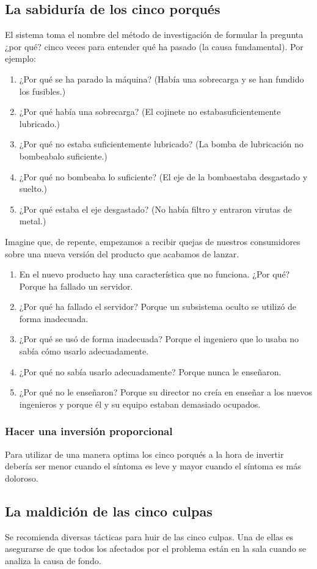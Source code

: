 \documentclass[10pt]{article}
\begin{document}
\begin{multicols}{2}
\subsection*{La sabiduría de los cinco porqués}
{\color{blue}El sistema toma el nombre del método de investigación de formular la pregunta ¿por qué? cinco veces para entender qué ha pasado (la causa fundamental).}
Por ejemplo:
\begin{enumerate}[\bfseries 1.]
\item ¿Por qué se ha parado la máquina? (Había una sobrecarga y se han fundido los fusibles.)
\item ¿Por qué había una sobrecarga? (El cojinete no estabasuficientemente lubricado.)
\item ¿Por qué no estaba suficientemente lubricado? (La bomba de lubricación no bombeabalo suficiente.)
\item  ¿Por qué no bombeaba lo suficiente? (El eje de la bombaestaba desgastado y suelto.)
\item  ¿Por qué estaba el eje desgastado? (No había filtro y entraron virutas de metal.)
\end{enumerate}
Imagine que, de repente, empezamos a recibir quejas de nuestros consumidores  sobre una nueva versión del producto que acabamos de lanzar.
\begin{enumerate}[\bfseries 1.]
\item  En el nuevo producto hay una característica que no funciona. ¿Por qué? Porque ha fallado un servidor.
\item  ¿Por qué ha fallado el servidor? Porque un subsistema oculto se utilizó de forma inadecuada.
\item  ¿Por qué se usó de forma inadecuada? Porque el ingeniero que lo usaba no sabía cómo usarlo adecuadamente.
\item  ¿Por qué no sabía usarlo adecuadamente? Porque nunca le enseñaron.
\item  ¿Por qué no le enseñaron? Porque su director no creía en enseñar a los nuevos ingenieros y porque él y su equipo estaban demasiado ocupados.
\end{enumerate}
\subsubsection*{Hacer una inversión proporcional}
Para utilizar de una manera optima los cinco porqués a la hora de invertir debería ser menor cuando el síntoma es leve y mayor cuando el síntoma es más doloroso. 
\subsection*{La maldición de las cinco culpas}
Se recomienda diversas tácticas para huir de las cinco culpas. Una de ellas es asegurarse de que todos los afectados por el problema están en la sala cuando se analiza la causa de fondo. 


\end{multicols}
\end{document}
